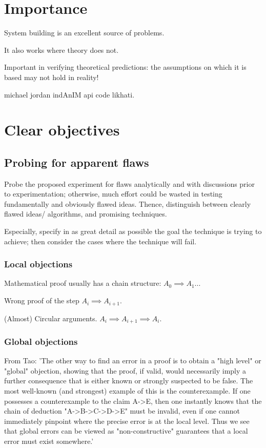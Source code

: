 \documentclass[oneside, article]{memoir}
\begin{document}
\section{Importance}
System building is an excellent source of problems.

It also works where theory does not.

Important in verifying theoretical predictions: the assumptions on which it is based may not hold in reality!

michael jordan indAnIM api code likhati.

\section{Clear objectives}
\subsection{Probing for apparent flaws}
Probe the proposed experiment for flaws analytically and with discussions prior to experimentation; otherwise, much effort could be wasted in testing fundamentally and obviously flawed ideas. Thence, distinguish between clearly flawed ideas/ algorithms, and promising techniques.

Especially, specify in as great detail as possible the goal the technique is trying to achieve; then consider the cases where the technique will fail.

\subsubsection{Local objections}
Mathematical proof usually has a chain structure: $A_0 \implies A_1 ..$.

Wrong proof of the step $A_i \implies A_{i+1}$.

(Almost) Circular arguments. $A_i \implies A_{i+1} \implies A_i$.

\subsubsection{Global objections}
From Tao: 'The other way to find an error in a proof is to obtain a "high level" or "global" objection, showing that the proof, if valid, would necessarily imply a further consequence that is either known or strongly suspected to be false. The most well-known (and strongest) example of this is the counterexample. If one possesses a counterexample to the claim A->E, then one instantly knows that the chain of deduction "A->B->C->D->E" must be invalid, even if one cannot immediately pinpoint where the precise error is at the local level. Thus we see that global errors can be viewed as "non-constructive" guarantees that a local error must exist somewhere.'
\end{document}
